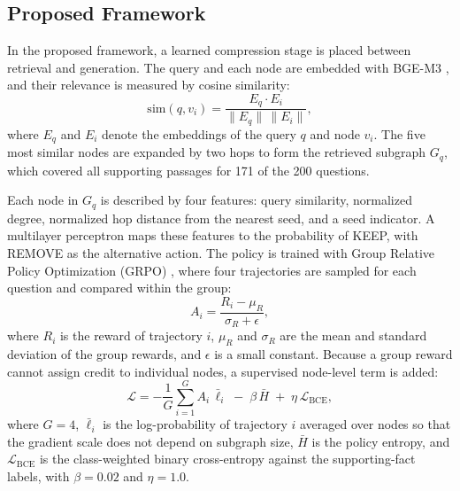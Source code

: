 \documentclass[conference]{IEEEtran}
\begin{document}
\subsection{Proposed Framework}
In the proposed framework, a learned compression stage is placed between retrieval and generation. The query and each node are embedded with BGE-M3 \cite{chen2024bgem3}, and their relevance is measured by cosine similarity:
\begin{equation}
    \mathrm{sim}(q, v_i) = \frac{E_q \cdot E_i}{\lVert E_q \rVert \, \lVert E_i \rVert},
    \label{eq:sim}
\end{equation}
where $E_q$ and $E_i$ denote the embeddings of the query $q$ and node $v_i$. The five most similar nodes are expanded by two hops to form the retrieved subgraph $G_q$, which covered all supporting passages for 171 of the 200 questions.

Each node in $G_q$ is described by four features: query similarity, normalized degree, normalized hop distance from the nearest seed, and a seed indicator. A multilayer perceptron maps these features to the probability of KEEP, with REMOVE as the alternative action. The policy is trained with Group Relative Policy Optimization (GRPO) \cite{shao2024deepseekmath}, where four trajectories are sampled for each question and compared within the group:
\begin{equation}
    A_i = \frac{R_i - \mu_R}{\sigma_R + \epsilon},
    \label{eq:adv}
\end{equation}
where $R_i$ is the reward of trajectory $i$, $\mu_R$ and $\sigma_R$ are the mean and standard deviation of the group rewards, and $\epsilon$ is a small constant. Because a group reward cannot assign credit to individual nodes, a supervised node-level term is added:
\begin{equation}
    \mathcal{L} = -\frac{1}{G}\sum_{i=1}^{G} A_i\,\bar{\ell}_i \;-\; \beta\,\bar{H} \;+\; \eta\,\mathcal{L}_{\mathrm{BCE}},
    \label{eq:loss}
\end{equation}
where $G=4$, $\bar{\ell}_i$ is the log-probability of trajectory $i$ averaged over nodes so that the gradient scale does not depend on subgraph size, $\bar{H}$ is the policy entropy, and $\mathcal{L}_{\mathrm{BCE}}$ is the class-weighted binary cross-entropy against the supporting-fact labels, with $\beta=0.02$ and $\eta=1.0$.
\end{document}
